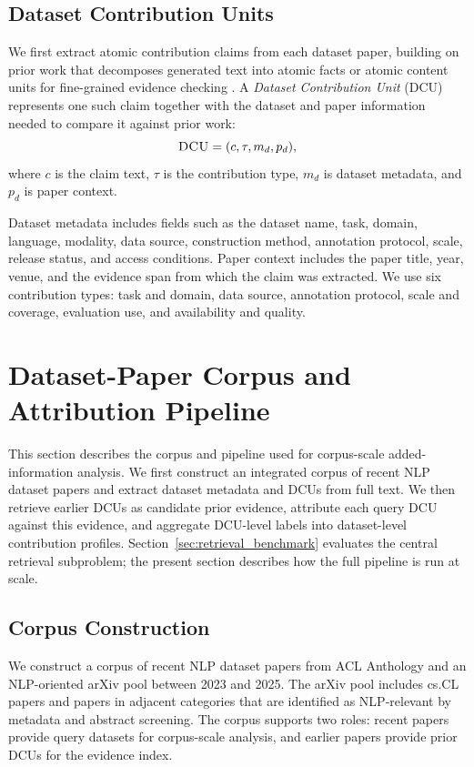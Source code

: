 \documentclass[11pt]{article}
\newcommand{\dcu}{\textsc{DCU}}
\begin{document}
\subsection{Dataset Contribution Units}
We first extract atomic contribution claims from each dataset paper, building on prior work that decomposes generated text into atomic facts or atomic content units for fine-grained evidence checking \citep{min2023factscore,wan2024acueval}.
A \emph{Dataset Contribution Unit} (DCU) represents one such claim together with the dataset and paper information needed to compare it against prior work:
\begin{equation}
    \dcu = (c,\tau,m_d,p_d),
\end{equation}
where $c$ is the claim text, $\tau$ is the contribution type, $m_d$ is dataset metadata, and $p_d$ is paper context.

Dataset metadata includes fields such as the dataset name, task, domain, language, modality, data source, construction method, annotation protocol, scale, release status, and access conditions.
Paper context includes the paper title, year, venue, and the evidence span from which the claim was extracted.
We use six contribution types: task and domain, data source, annotation protocol, scale and coverage, evaluation use, and availability and quality.
\section{Dataset-Paper Corpus and Attribution Pipeline}
\label{sec:pipeline}

This section describes the corpus and pipeline used for corpus-scale added-information analysis.
We first construct an integrated corpus of recent NLP dataset papers and extract dataset metadata and DCUs from full text.
We then retrieve earlier DCUs as candidate prior evidence, attribute each query DCU against this evidence, and aggregate DCU-level labels into dataset-level contribution profiles.
Section~\ref{sec:retrieval_benchmark} evaluates the central retrieval subproblem; the present section describes how the full pipeline is run at scale.
\subsection{Corpus Construction}
We construct a corpus of recent NLP dataset papers from ACL Anthology and an NLP-oriented arXiv pool between 2023 and 2025.
The arXiv pool includes cs.CL papers and papers in adjacent categories that are identified as NLP-relevant by metadata and abstract screening.
The corpus supports two roles: recent papers provide query datasets for corpus-scale analysis, and earlier papers provide prior DCUs for the evidence index. 
\end{document}
